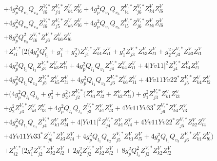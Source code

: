 \begin{align}
 &+4 g_{p}^{2} Q_{v_1} Q_{v_3} Z^{V,*}_{i 6} Z^{V,*}_{j 4} Z_{{k 4}}^{V} Z_{{l 6}}^{V} +4 g_{p}^{2} Q_{v_1} Q_{v_3} Z^{V,*}_{i 4} Z^{V,*}_{j 6} Z_{{k 4}}^{V} Z_{{l 6}}^{V} \nonumber \\ 
 &+4 g_{p}^{2} Q_{v_2} Q_{v_3} Z^{V,*}_{i 6} Z^{V,*}_{j 5} Z_{{k 5}}^{V} Z_{{l 6}}^{V} +4 g_{p}^{2} Q_{v_2} Q_{v_3} Z^{V,*}_{i 5} Z^{V,*}_{j 6} Z_{{k 5}}^{V} Z_{{l 6}}^{V} \nonumber \\ 
 &+8 g_{p}^{2} Q_{v_3}^{2} Z^{V,*}_{i 6} Z^{V,*}_{j 6} Z_{{k 6}}^{V} Z_{{l 6}}^{V} \nonumber \\ 
 &+Z^{V,*}_{i 1} \Big(2 \Big(4 g_{p}^{2} Q_{l_1}^{2}  + g_{1}^{2} + g_{2}^{2}\Big)Z^{V,*}_{j 1} Z_{{k 1}}^{V} Z_{{l 1}}^{V} +g_{1}^{2} Z^{V,*}_{j 3} Z_{{k 3}}^{V} Z_{{l 1}}^{V} +g_{2}^{2} Z^{V,*}_{j 3} Z_{{k 3}}^{V} Z_{{l 1}}^{V} \nonumber \\ 
 &+4 g_{p}^{2} Q_{l_1} Q_{l_3} Z^{V,*}_{j 3} Z_{{k 3}}^{V} Z_{{l 1}}^{V} +4 g_{p}^{2} Q_{l_1} Q_{v_1} Z^{V,*}_{j 4} Z_{{k 4}}^{V} Z_{{l 1}}^{V} +4 |Yv11|^2 Z^{V,*}_{j 4} Z_{{k 4}}^{V} Z_{{l 1}}^{V} \nonumber \\ 
 &+4 g_{p}^{2} Q_{l_1} Q_{v_2} Z^{V,*}_{j 5} Z_{{k 5}}^{V} Z_{{l 1}}^{V} +4 g_{p}^{2} Q_{l_1} Q_{v_3} Z^{V,*}_{j 6} Z_{{k 6}}^{V} Z_{{l 1}}^{V} +4 Yv11 Yv22^* Z^{V,*}_{j 5} Z_{{k 4}}^{V} Z_{{l 2}}^{V} \nonumber \\ 
 &+\Big(4 g_{p}^{2} Q_{l_1} Q_{l_2}  + g_{1}^{2} + g_{2}^{2}\Big)Z^{V,*}_{j 2} \Big(Z_{{k 1}}^{V} Z_{{l 2}}^{V}  + Z_{{k 2}}^{V} Z_{{l 1}}^{V} \Big)+g_{1}^{2} Z^{V,*}_{j 3} Z_{{k 1}}^{V} Z_{{l 3}}^{V} \nonumber \\ 
 &+g_{2}^{2} Z^{V,*}_{j 3} Z_{{k 1}}^{V} Z_{{l 3}}^{V} +4 g_{p}^{2} Q_{l_1} Q_{l_3} Z^{V,*}_{j 3} Z_{{k 1}}^{V} Z_{{l 3}}^{V} +4 Yv11 Yv33^* Z^{V,*}_{j 6} Z_{{k 4}}^{V} Z_{{l 3}}^{V} \nonumber \\ 
 &+4 g_{p}^{2} Q_{l_1} Q_{v_1} Z^{V,*}_{j 4} Z_{{k 1}}^{V} Z_{{l 4}}^{V} +4 |Yv11|^2 Z^{V,*}_{j 4} Z_{{k 1}}^{V} Z_{{l 4}}^{V} +4 Yv11 Yv22^* Z^{V,*}_{j 5} Z_{{k 2}}^{V} Z_{{l 4}}^{V} \nonumber \\ 
 &+4 Yv11 Yv33^* Z^{V,*}_{j 6} Z_{{k 3}}^{V} Z_{{l 4}}^{V} +4 g_{p}^{2} Q_{l_1} Q_{v_2} Z^{V,*}_{j 5} Z_{{k 1}}^{V} Z_{{l 5}}^{V} +4 g_{p}^{2} Q_{l_1} Q_{v_3} Z^{V,*}_{j 6} Z_{{k 1}}^{V} Z_{{l 6}}^{V} \Big)\nonumber \\ 
 &+Z^{V,*}_{i 2} \Big(2 g_{1}^{2} Z^{V,*}_{j 2} Z_{{k 2}}^{V} Z_{{l 2}}^{V} +2 g_{2}^{2} Z^{V,*}_{j 2} Z_{{k 2}}^{V} Z_{{l 2}}^{V} +8 g_{p}^{2} Q_{l_2}^{2} Z^{V,*}_{j 2} Z_{{k 2}}^{V} Z_{{l 2}}^{V} \nonumber \\ 

\end{align}
